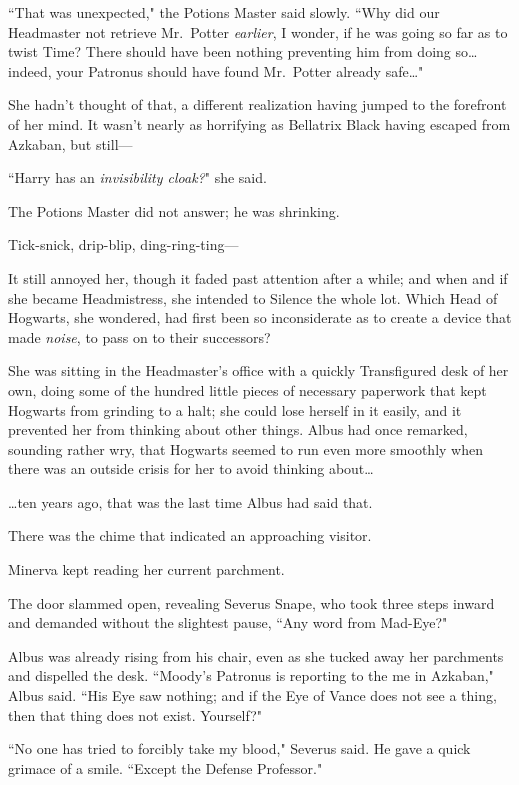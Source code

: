 ``That was unexpected," the Potions Master said slowly. ``Why did our Headmaster not retrieve Mr.~Potter \emph{earlier}, I wonder, if he was going so far as to twist Time? There should have been nothing preventing him from doing so{\ldots} indeed, your Patronus should have found Mr.~Potter already safe{\ldots}"

She hadn't thought of that, a different realization having jumped to the forefront of her mind. It wasn't nearly as horrifying as Bellatrix Black having escaped from Azkaban, but still---

``Harry has an \emph{invisibility cloak?}" she said.

The Potions Master did not answer; he was shrinking.

\later

Tick-snick, drip-blip, ding-ring-ting---

It still annoyed her, though it faded past attention after a while; and when and if she became Headmistress, she intended to Silence the whole lot. Which Head of Hogwarts, she wondered, had first been so inconsiderate as to create a device that made \emph{noise}, to pass on to their successors?

She was sitting in the Headmaster's office with a quickly Transfigured desk of her own, doing some of the hundred little pieces of necessary paperwork that kept Hogwarts from grinding to a halt; she could lose herself in it easily, and it prevented her from thinking about other things. Albus had once remarked, sounding rather wry, that Hogwarts seemed to run even more smoothly when there was an outside crisis for her to avoid thinking about{\ldots}

{\ldots}ten years ago, that was the last time Albus had said that.

There was the chime that indicated an approaching visitor.

Minerva kept reading her current parchment.

The door slammed open, revealing Severus Snape, who took three steps inward and demanded without the slightest pause, ``Any word from Mad-Eye?"

Albus was already rising from his chair, even as she tucked away her parchments and dispelled the desk. ``Moody's Patronus is reporting to the me in Azkaban," Albus said. ``His Eye saw nothing; and if the Eye of Vance does not see a thing, then that thing does not exist. Yourself?"

``No one has tried to forcibly take my blood," Severus said. He gave a quick grimace of a smile. ``Except the Defense Professor."

